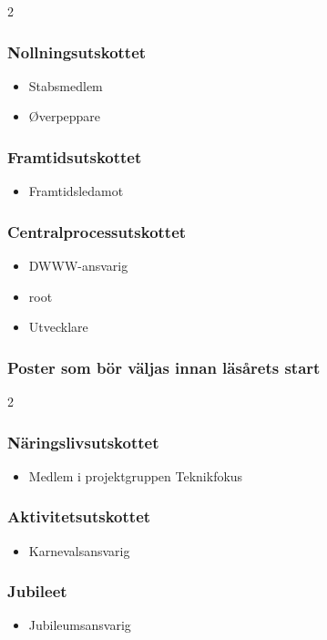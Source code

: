 \documentclass{dsekprotokoll}
\begin{document}
\begin{multicols}{2}
    \subsubsection*{Nollningsutskottet}
    \begin{itemize}
        \item Stabsmedlem
        \item Øverpeppare
    \end{itemize}

    \subsubsection*{Framtidsutskottet}
    \begin{itemize}
        \item Framtidsledamot
    \end{itemize}

    \subsubsection*{Centralprocessutskottet}
    \begin{itemize}
    \item DWWW-ansvarig
    \item root
    \item Utvecklare
    \end{itemize}
    
\end{multicols}

\subsubsection*{Poster som bör väljas innan läsårets start}

\begin{multicols}{2}
    \subsubsection*{Näringslivsutskottet}
    \begin{itemize}
        \item Medlem i projektgruppen Teknikfokus
    \end{itemize}

    \subsubsection*{Aktivitetsutskottet}
    \begin{itemize}
        \item Karnevalsansvarig
    \end{itemize}

    \subsubsection*{Jubileet}
    \begin{itemize}
        \item Jubileumsansvarig
    \end{itemize}

\end{multicols}
\end{document}
